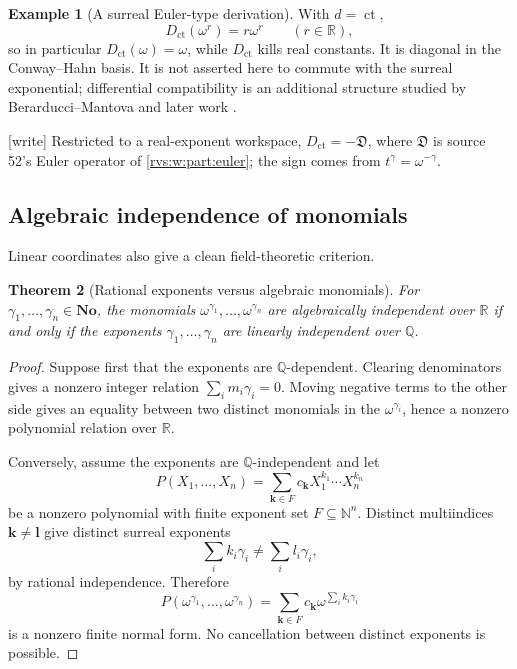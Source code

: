 \documentclass[11pt,letterpaper]{article}
\numberwithin{equation}{section}
\newtheorem{theorem}{Theorem}[section]
\theoremstyle{definition}
\newtheorem{example}[theorem]{Example}
\theoremstyle{remark}
\newcommand{\No}{\mathbf{No}}
\newcommand{\R}{\mathbb{R}}
\newcommand{\Q}{\mathbb{Q}}
\newcommand{\N}{\mathbb{N}}
\newcommand{\ct}{\operatorname{ct}}
\newcommand{\EuD}{\mathfrak D}%
\newcommand{\wtag}{\textup{[write]}}%
\begin{document}
\begin{example}[A surreal Euler-type derivation]
With \(d=\ct\),
\[
  D_{\ct}(\omega^r)=r\omega^r\qquad(r\in\R),
\]
so in particular \(D_{\ct}(\omega)=\omega\), while
\(D_{\ct}\) kills real constants.  It is diagonal in the Conway--Hahn basis.
It is not asserted here to commute with the surreal exponential; differential
compatibility is an additional structure studied by Berarducci--Mantova and
later work \cite{BerarducciMantova,ADH}.
\end{example}

\noindent\wtag{} Restricted to a real-exponent workspace,
\(D_{\ct}=-\EuD\), where \(\EuD\) is source 52's Euler operator of
\cref{rvs:w:part:euler}; the sign comes from \(t^\gamma=\omega^{-\gamma}\).


\subsection{Algebraic independence of monomials}

Linear coordinates also give a clean field-theoretic criterion.

\begin{theorem}[Rational exponents versus algebraic monomials]
\label{rvs:thm:monomial-alg-ind}
For \(\gamma_1,\ldots,\gamma_n\in\No\), the monomials
\(\omega^{\gamma_1},\ldots,\omega^{\gamma_n}\) are algebraically independent
over \(\R\) if and only if the exponents
\(\gamma_1,\ldots,\gamma_n\) are linearly independent over \(\Q\).
\end{theorem}

\begin{proof}
Suppose first that the exponents are \(\Q\)-dependent.  Clearing
denominators gives a nonzero integer relation
\(\sum_i m_i\gamma_i=0\).  Moving negative terms to the other side gives an
equality between two distinct monomials in the
\(\omega^{\gamma_i}\), hence a nonzero polynomial relation over \(\R\).

Conversely, assume the exponents are \(\Q\)-independent and let
\[
 P(X_1,\ldots,X_n)=\sum_{\mathbf{k}\in F}
 c_{\mathbf{k}}X_1^{k_1}\cdots X_n^{k_n}
\]
be a nonzero polynomial with finite exponent set
\(F\subseteq\N^n\).  Distinct multiindices \(\mathbf{k}\ne\mathbf{l}\)
give distinct surreal exponents
\[
  \sum_i k_i\gamma_i\ne\sum_i l_i\gamma_i,
\]
by rational independence.  Therefore
\[
 P(\omega^{\gamma_1},\ldots,\omega^{\gamma_n})
 =\sum_{\mathbf{k}\in F}
 c_{\mathbf{k}}\omega^{\sum_i k_i\gamma_i}
\]
is a nonzero finite normal form.  No cancellation between distinct exponents
is possible.
\end{proof}
\end{document}
